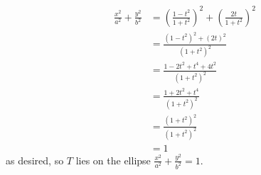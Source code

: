 \Question{\currfilebase}

\begin{align*}
    \frac{x^2}{a^2} + \frac{y^2}{b^2} &= \left(\frac{1-t^2}{1+t^2}\right)^2 + \left(\frac{2t}{1+t^2}\right)^2\\
    &= \frac{\left(1 - t^2\right)^2 + \left(2t\right)^2}{\left(1 + t^2\right)^2}\\
    &= \frac{1 - 2t^2 + t^4 + 4t^2}{\left(1 + t^2\right)^2}\\
    &= \frac{1 + 2t^2 + t^4}{\left(1 + t^2\right)^2}\\
    &= \frac{\left(1 + t^2\right)^2}{\left(1 + t^2\right)^2}\\
    &= 1
\end{align*}
as desired, so \(T\) lies on the ellipse \(\frac{x^2}{a^2} + \frac{y^2}{b^2} = 1\).

